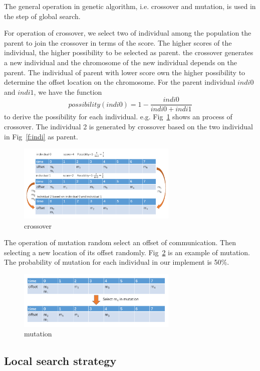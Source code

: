 \documentclass[journal]{IEEEtran}
\begin{document}
The general operation in genetic algorithm, i.e. crossover and mutation, is used in the step of global search. 

For operation of crossover, we select two of individual among the population the parent to join the crossover in terms of the score. The higher scores of the individual, the higher possibility to be selected as parent. the crossover generates a new individual and the chromosome of the new individual depends on the parent. The individual of parent with lower score own the higher possibility to determine the offset location on the chromosome. For the parent individual $indi0$ and $indi1$, we have the function
\begin{equation}
	possibility(indi0)=1-\frac{indi0}{indi0+indi1}
\end{equation}
to derive the possibility for each individual. e.g. Fig~\ref{f:crossover} shows an process of crossover. The individual 2 is generated by crossover based on the two individual in Fig~\ref{f:indi} as parent.
\begin{figure}[!t]
	\centering
	\includegraphics[width=3in]{picture/crossover.pdf}
	\caption{crossover}
	\label{f:crossover}
\end{figure}

The operation of mutation random select an offset of communication. Then selecting a new location of its offset randomly. Fig~\ref{f:mutation} is an example of mutation. The probability of mutation for each individual in our implement is 50\%.
\begin{figure}[!t]
	\centering
	\includegraphics[width=3in]{picture/mutation.pdf}
	\caption{mutation}
	\label{f:mutation}
\end{figure}

\subsection{Local search strategy}
\end{document}
